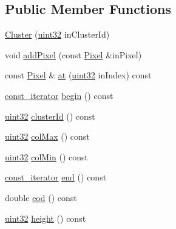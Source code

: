 \subsection*{Public Member Functions}
\begin{DoxyCompactItemize}
\item 
\mbox{\hyperlink{class_num_c_1_1_image_processing_1_1_cluster_a9f76063fa94efeba8dc19fa7dafa01dd}{Cluster}} (\mbox{\hyperlink{namespace_num_c_ae685802ca6d3035f2b400b081e3953fa}{uint32}} in\+Cluster\+Id)
\item 
void \mbox{\hyperlink{class_num_c_1_1_image_processing_1_1_cluster_a7a36d85bbc283a7a134d75a5400f8190}{add\+Pixel}} (const \mbox{\hyperlink{class_num_c_1_1_image_processing_1_1_pixel}{Pixel}} \&in\+Pixel)
\item 
const \mbox{\hyperlink{class_num_c_1_1_image_processing_1_1_pixel}{Pixel}} \& \mbox{\hyperlink{class_num_c_1_1_image_processing_1_1_cluster_afe0f04cc5bb5d8554beffe6c78f2ad42}{at}} (\mbox{\hyperlink{namespace_num_c_ae685802ca6d3035f2b400b081e3953fa}{uint32}} in\+Index) const
\item 
\mbox{\hyperlink{class_num_c_1_1_image_processing_1_1_cluster_a15d2f9ebeba9062779e57a6fdce9faa0}{const\+\_\+iterator}} \mbox{\hyperlink{class_num_c_1_1_image_processing_1_1_cluster_a692e76f15ac0f1678e0a89654ff42665}{begin}} () const
\item 
\mbox{\hyperlink{namespace_num_c_ae685802ca6d3035f2b400b081e3953fa}{uint32}} \mbox{\hyperlink{class_num_c_1_1_image_processing_1_1_cluster_a8fe2d714671211323492cb875b7de7c9}{cluster\+Id}} () const
\item 
\mbox{\hyperlink{namespace_num_c_ae685802ca6d3035f2b400b081e3953fa}{uint32}} \mbox{\hyperlink{class_num_c_1_1_image_processing_1_1_cluster_a8e01fbf35d0e95108c7e44bf271650a0}{col\+Max}} () const
\item 
\mbox{\hyperlink{namespace_num_c_ae685802ca6d3035f2b400b081e3953fa}{uint32}} \mbox{\hyperlink{class_num_c_1_1_image_processing_1_1_cluster_a134813f8578f28a62bb3f5995fb3fc30}{col\+Min}} () const
\item 
\mbox{\hyperlink{class_num_c_1_1_image_processing_1_1_cluster_a15d2f9ebeba9062779e57a6fdce9faa0}{const\+\_\+iterator}} \mbox{\hyperlink{class_num_c_1_1_image_processing_1_1_cluster_ad3ac71a698ea0bbcc1fc5f71b4dc4eb7}{end}} () const
\item 
double \mbox{\hyperlink{class_num_c_1_1_image_processing_1_1_cluster_ad1816507512dc817b9e3619ff482c9ed}{eod}} () const
\item 
\mbox{\hyperlink{namespace_num_c_ae685802ca6d3035f2b400b081e3953fa}{uint32}} \mbox{\hyperlink{class_num_c_1_1_image_processing_1_1_cluster_a4b09031519932642dced2e943c5ce6d6}{height}} () const

\end{DoxyCompactItemize}
